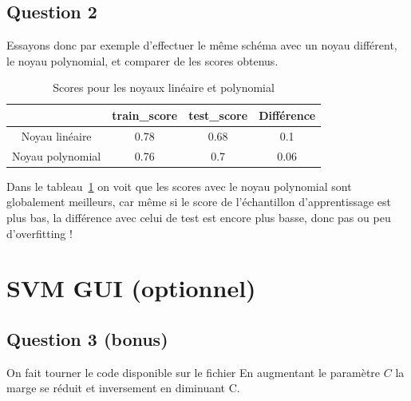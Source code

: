 \documentclass[11pt,a4paper]{article}
\begin{document}
\subsection*{Question 2}
Essayons donc par exemple d'effectuer le même schéma avec un noyau différent, le noyau polynomial, et comparer de les scores obtenus.
\begin{table}[H]
    \centering
    \begin{tabular}{|c|c|c|c|}
        \hline
        & train\_score & test\_score & Différence \\ 
        \hline
        Noyau linéaire & 0.78 & 0.68 & 0.1 \\
        \hline
        Noyau polynomial & 0.76 & 0.7 & 0.06 \\
        \hline
    \end{tabular}
    \caption{Scores pour les noyaux linéaire et polynomial}
    \label{Tableau 1}
\end{table}
Dans le tableau~\ref{Tableau 1} on voit que les scores avec le noyau polynomial sont globalement meilleurs, car même si le score de l'échantillon d'apprentissage est plus bas, la différence avec celui de test est encore plus basse, donc pas ou peu d'overfitting !

\section*{SVM GUI (optionnel)}
\subsection*{Question 3 (bonus)}
On fait tourner le code disponible sur le fichier 
En augmentant le paramètre $C$ la marge se réduit et inversement en diminuant C.
\end{document}
